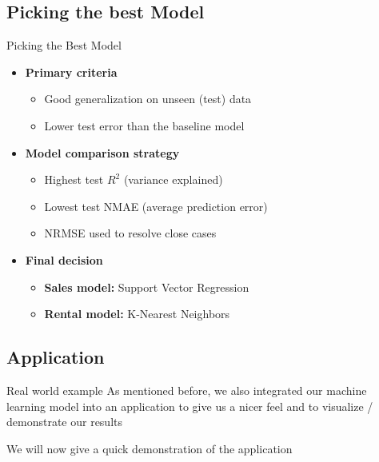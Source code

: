 \documentclass{beamer}
\begin{document}
    \subsection{Picking the best Model}
      \begin{frame}{Picking the Best Model}

      \begin{itemize}
        \item \textbf{Primary criteria}
          \begin{itemize}
            \item Good generalization on unseen (test) data
            \item Lower test error than the baseline model
          \end{itemize}

        \pause
        \vspace{0.5em}

        \item \textbf{Model comparison strategy}
          \begin{itemize}
            \item Highest test $R^2$ (variance explained)
            \item Lowest test NMAE (average prediction error)
            \item NRMSE used to resolve close cases
          \end{itemize}

        \vspace{0.5em}
        \pause

        \item \textbf{Final decision}
          \begin{itemize}
            \item \textbf{Sales model:} Support Vector Regression
            \item \textbf{Rental model:} K-Nearest Neighbors
          \end{itemize}
      \end{itemize}

      \end{frame}

    \subsection{Application}
      \begin{frame}{Real world example}
        As mentioned before, we also integrated our machine learning model into an application to give us a nicer feel and to visualize / demonstrate our results \newline

        We will now give a quick demonstration of the application
      \end{frame}
\end{document}
